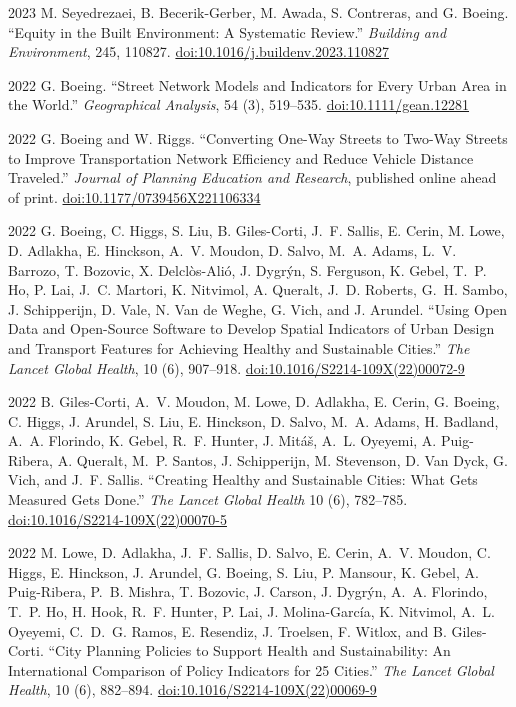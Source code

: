 \documentclass[11pt,letterpaper]{report}
\begin{document}
\begin{tablist}
        \item[2023] \tab{}M. Seyedrezaei, B. Becerik-Gerber, M. Awada, S. Contreras, and G. Boeing. \enquote{Equity in the Built Environment: A Systematic Review.} \textit{Building and Environment}, 245, 110827. \href{https://doi.org/10.1016/j.buildenv.2023.110827}{doi:10.1016/j.buildenv.2023.110827}

        \item[2022] \tab{}G. Boeing. \enquote{Street Network Models and Indicators for Every Urban Area in the World.} \textit{Geographical Analysis}, 54 (3), 519--535. \href{https://doi.org/10.1111/gean.12281}{doi:10.1111/gean.12281}

        \item[2022] \tab{}G. Boeing and W. Riggs. \enquote{Converting One-Way Streets to Two-Way Streets to Improve Transportation Network Efficiency and Reduce Vehicle Distance Traveled.} \textit{Journal of Planning Education and Research}, published online ahead of print. \href{https://doi.org/10.1177/0739456X221106334}{doi:10.1177/0739456X221106334}

        \item[2022] \tab{}G. Boeing, C. Higgs, S. Liu, B. Giles-Corti, J.~F. Sallis, E. Cerin, M. Lowe, D. Adlakha, E. Hinckson, A.~V. Moudon, D. Salvo, M.~A. Adams, L.~V. Barrozo, T. Bozovic, X. Delclòs-Alió, J. Dygrýn, S. Ferguson, K. Gebel, T.~P. Ho, P. Lai, J.~C. Martori, K. Nitvimol, A. Queralt, J.~D. Roberts, G.~H. Sambo, J. Schipperijn, D. Vale, N. Van de Weghe, G. Vich, and J. Arundel. \enquote{Using Open Data and Open-Source Software to Develop Spatial Indicators of Urban Design and Transport Features for Achieving Healthy and Sustainable Cities.} \textit{The Lancet Global Health}, 10 (6), 907--918. \href{https://doi.org/10.1016/S2214-109X(22)00072-9}{doi:10.1016/S2214-109X(22)00072-9}

        \item[2022] \tab{}B. Giles-Corti, A.~V. Moudon, M. Lowe, D. Adlakha, E. Cerin, G. Boeing, C. Higgs, J. Arundel, S. Liu, E. Hinckson, D. Salvo, M.~A. Adams, H. Badland, A.~A. Florindo, K. Gebel, R.~F. Hunter, J. Mitáš, A.~L. Oyeyemi, A. Puig-Ribera, A. Queralt, M.~P. Santos, J. Schipperijn, M. Stevenson, D. Van Dyck, G. Vich, and J.~F. Sallis. \enquote{Creating Healthy and Sustainable Cities: What Gets Measured Gets Done.} \textit{The Lancet Global Health} 10 (6), 782--785. \href{https://doi.org/10.1016/S2214-109X(22)00070-5}{doi:10.1016/S2214-109X(22)00070-5}

        \item[2022] \tab{}M. Lowe, D. Adlakha, J.~F. Sallis, D. Salvo, E. Cerin, A.~V. Moudon, C. Higgs, E. Hinckson, J. Arundel, G. Boeing, S. Liu, P. Mansour, K. Gebel, A. Puig-Ribera, P.~B. Mishra, T. Bozovic, J. Carson, J. Dygrýn, A.~A. Florindo, T.~P. Ho, H. Hook, R.~F. Hunter, P. Lai, J. Molina-García, K. Nitvimol, A.~L. Oyeyemi, C.~D.~G. Ramos, E. Resendiz, J. Troelsen, F. Witlox, and B. Giles-Corti. \enquote{City Planning Policies to Support Health and Sustainability: An International Comparison of Policy Indicators for 25 Cities.}  \textit{The Lancet Global Health}, 10 (6), 882--894. \href{https://doi.org/10.1016/S2214-109X(22)00069-9}{doi:10.1016/S2214-109X(22)00069-9}


\end{tablist}
\end{document}
